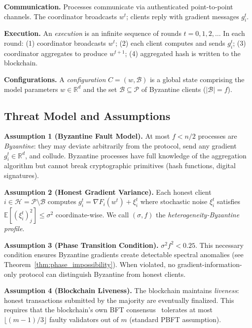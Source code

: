 \documentclass[runningheads]{llncs}
\begin{document}
\smallskip
\noindent\textbf{Communication.} Processes communicate via authenticated point-to-point channels. The coordinator broadcasts $w^t$; clients reply with gradient messages $g_i^t$.

\smallskip
\noindent\textbf{Execution.} An \emph{execution} is an infinite sequence of rounds $t = 0, 1, 2, \ldots$ In each round: (1) coordinator broadcasts $w^t$; (2) each client computes and sends $g_i^t$; (3) coordinator aggregates to produce $w^{t+1}$; (4) aggregated hash is written to the blockchain.

\smallskip
\noindent\textbf{Configurations.} A \emph{configuration} $C = (w, \mathcal{B})$ is a global state comprising the model parameters $w \in \mathbb{R}^d$ and the set $\mathcal{B} \subseteq \mathcal{P}$ of Byzantine clients ($|\mathcal{B}| = f$).

\subsection{Threat Model and Assumptions}
\label{sec:threat_model}

\noindent\textbf{Assumption 1 (Byzantine Fault Model).}
At most $f < n/2$ processes are \emph{Byzantine}: they may deviate arbitrarily from the protocol, send any gradient $g_i^t \in \mathbb{R}^d$, and collude. Byzantine processes have full knowledge of the aggregation algorithm but cannot break cryptographic primitives (hash functions, digital signatures).

\noindent\textbf{Assumption 2 (Honest Gradient Variance).}
Each honest client $i \in \mathcal{H} = \mathcal{P} \setminus \mathcal{B}$ computes $g_i^t = \nabla F_i(w^t) + \xi_i^t$ where stochastic noise $\xi_i^t$ satisfies $\mathbb{E}[(\xi_i^t)_j^2] \leq \sigma^2$ coordinate-wise. We call $(\sigma, f)$ the \emph{heterogeneity-Byzantine profile}.

\noindent\textbf{Assumption 3 (Phase Transition Condition).}
$\sigma^2 f^2 < 0.25$. This necessary condition ensures Byzantine gradients create detectable spectral anomalies (see Theorem~\ref{thm:phase_impossibility}). When violated, no gradient-information-only protocol can distinguish Byzantine from honest clients.

\noindent\textbf{Assumption 4 (Blockchain Liveness).}
The blockchain maintains \emph{liveness}: honest transactions submitted by the majority are eventually finalized. This requires that the blockchain's own BFT consensus~\cite{bft_consensus} tolerates at most $\lfloor(m-1)/3\rfloor$ faulty validators out of $m$ (standard PBFT assumption).
\end{document}
